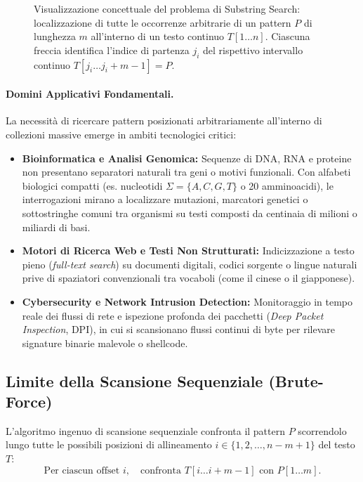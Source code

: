 \begin{figure}[H]
{\begin{tikzpicture}
\end{tikzpicture}%
}
\caption{Visualizzazione concettuale del problema di Substring Search: localizzazione di tutte le occorrenze arbitrarie di un pattern $P$ di lunghezza $m$ all'interno di un testo continuo $T[1 \dots n]$. Ciascuna freccia identifica l'indice di partenza $j_i$ del rispettivo intervallo continuo $T[j_i \dots j_i + m - 1] = P$.}
\label{fig:substring-search-overview}
\end{figure}

\paragraph{Domini Applicativi Fondamentali.}
La necessit\`a di ricercare pattern posizionati arbitrariamente all'interno di collezioni massive emerge in ambiti tecnologici critici:
\begin{itemize}
  \item \textbf{Bioinformatica e Analisi Genomica:} Sequenze di DNA, RNA e proteine non presentano separatori naturali tra geni o motivi funzionali. Con alfabeti biologici compatti (es. nucleotidi $\Sigma = \{A, C, G, T\}$ o 20 amminoacidi), le interrogazioni mirano a localizzare mutazioni, marcatori genetici o sottostringhe comuni tra organismi su testi composti da centinaia di milioni o miliardi di basi.
  \item \textbf{Motori di Ricerca Web e Testi Non Strutturati:} Indicizzazione a testo pieno (\textit{full-text search}) su documenti digitali, codici sorgente o lingue naturali prive di spaziatori convenzionali tra vocaboli (come il cinese o il giapponese).
  \item \textbf{Cybersecurity e Network Intrusion Detection:} Monitoraggio in tempo reale dei flussi di rete e ispezione profonda dei pacchetti (\textit{Deep Packet Inspection}, DPI), in cui si scansionano flussi continui di byte per rilevare signature binarie malevole o shellcode.
\end{itemize}

\FloatBarrier
\subsection{Limite della Scansione Sequenziale (Brute-Force)}
\label{subsec:limite-brute-force}

L'algoritmo ingenuo di scansione sequenziale confronta il pattern $P$ scorrendolo lungo tutte le possibili posizioni di allineamento $i \in \{1, 2, \dots, n - m + 1\}$ del testo $T$:
\begin{equation}
  \text{Per ciascun offset } i, \quad \text{confronta } T[i \dots i + m - 1] \text{ con } P[1 \dots m].
\end{equation}

